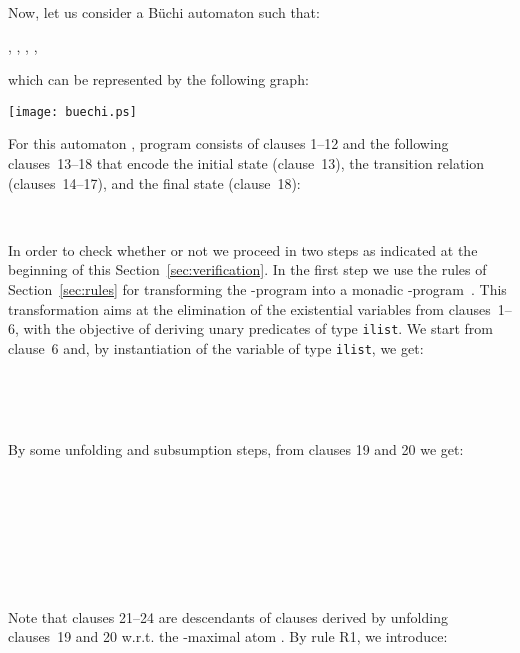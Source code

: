\documentclass[english]{tlp}
\begin{document}
\begin{example}
Now,  let us consider a B\"{u}chi automaton
 such that:

, , ,
, 

\noindent which can be represented by the following graph:

\vspace{-1.5mm}
\begin{center}
\texttt{[image: buechi.ps]}
\end{center}
\vspace{-1mm}

\noindent For this automaton , program  consists of clauses 1--12 
and the following clauses~\mbox{13--18} that encode
 the initial state (clause~13), the transition relation \linebreak
(clauses~14--17), and the final state (clause~18):

\smallskip


~

\smallskip
\noindent \noindent \noindent In order to check whether or not  we proceed in two steps as indicated at the 
beginning of this Section~\ref{sec:verification}. 
In the first step we use
the rules of Section~\ref{sec:rules} for transforming the
-program  into a monadic -program~.
This transformation aims at the elimination of the existential variables
from clauses~1--6, with the objective of deriving unary
predicates of type {\texttt{ilist}}. We start from clause~6 and, by
instantiation of the variable  of type {\texttt{ilist}}, we get:

\smallskip

~

~

\smallskip

\noindent By some unfolding and subsumption steps, from clauses 19 and 20 we
get:

\smallskip

~

~

~

~

\smallskip

\noindent Note that clauses 21--24 are descendants of clauses derived by
unfolding clauses~19 and 20 w.r.t. the -maximal atom
. By rule R1, we introduce:


\end{example}
\end{document}
